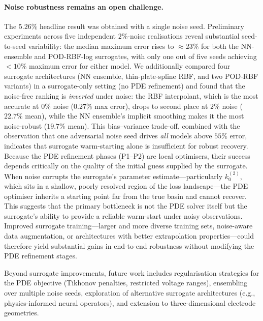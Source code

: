 \documentclass[11pt,a4paper]{article}
\newcommand{\kzero}{k_0}
\begin{document}
\paragraph{Noise robustness remains an open challenge.}
The $5.26\%$ headline result was obtained with a single noise seed.
Preliminary experiments across five independent $2\%$-noise realisations
reveal substantial seed-to-seed variability: the median maximum error
rises to $\approx 23\%$ for both the NN-ensemble and POD-RBF-log
surrogates, with only one out of five seeds achieving $< 10\%$ maximum
error for either model.  We additionally compared four surrogate
architectures (NN ensemble, thin-plate-spline RBF, and two POD-RBF
variants) in a surrogate-only setting (no PDE refinement) and found that
the noise-free ranking is \emph{inverted} under noise: the RBF
interpolant, which is the most accurate at $0\%$ noise ($0.27\%$ max
error), drops to second place at $2\%$ noise ($22.7\%$ mean), while the
NN ensemble's implicit smoothing makes it the most noise-robust
($19.7\%$ mean).  This bias--variance trade-off, combined with the
observation that one adversarial noise seed drives \emph{all} models
above $55\%$ error, indicates that surrogate warm-starting alone is
insufficient for robust recovery.  Because the PDE refinement phases
(P1--P2) are local optimisers, their success depends critically on the
quality of the initial guess supplied by the surrogate.  When noise
corrupts the surrogate's parameter estimate---particularly
$\kzero^{(2)}$, which sits in a shallow, poorly resolved region of the
loss landscape---the PDE optimiser inherits a starting point far from
the true basin and cannot recover.  This suggests that the primary
bottleneck is not the PDE solver itself but the surrogate's ability to
provide a reliable warm-start under noisy observations.  Improved
surrogate training---larger and more diverse training sets, noise-aware
data augmentation, or architectures with better extrapolation
properties---could therefore yield substantial gains in end-to-end
robustness without modifying the PDE refinement stages.

Beyond surrogate improvements, future work includes regularisation
strategies for the PDE objective (Tikhonov penalties, restricted voltage
ranges), ensembling over multiple noise seeds, exploration of
alternative surrogate architectures (e.g., physics-informed neural
operators), and extension to three-dimensional electrode geometries.
\end{document}
